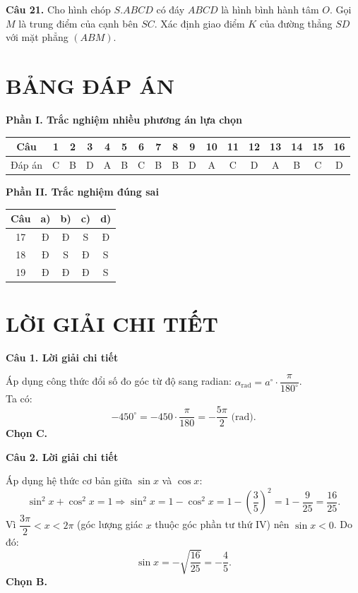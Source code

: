 \documentclass[12pt, a4paper]{article}
\newcommand{\cau}[1]{\vspace{0.12cm}\noindent\textbf{Câu #1. }}
\newcommand{\filllines}[1]{}
\begin{document}
\cau{21} Cho hình chóp $S.ABCD$ có đáy $ABCD$ là hình bình hành tâm $O$. Gọi $M$ là trung điểm của cạnh bên $SC$. Xác định giao điểm $K$ của đường thẳng $SD$ với mặt phẳng $(ABM)$.
\filllines{6}

\clearpage
\section*{BẢNG ĐÁP ÁN}
\noindent\textbf{Phần I. Trắc nghiệm nhiều phương án lựa chọn}
\begin{center}
\small
\renewcommand{\arraystretch}{1.2}
\begin{tabular}{c|*{16}{c|}}
Câu & 1 & 2 & 3 & 4 & 5 & 6 & 7 & 8 & 9 & 10 & 11 & 12 & 13 & 14 & 15 & 16 \\\hline
Đáp án & C & B & D & A & B & C & B & B & D & A & C & D & A & B & C & D \\
\end{tabular}
\end{center}
\noindent\textbf{Phần II. Trắc nghiệm đúng sai}
\begin{center}
\small
\renewcommand{\arraystretch}{1.2}
\begin{tabular}{c|c|c|c|c}
Câu & a) & b) & c) & d) \\\hline
17 & Đ & Đ & S & Đ \\
18 & Đ & S & Đ & S \\
19 & Đ & Đ & Đ & S \\
\end{tabular}
\end{center}

\section*{LỜI GIẢI CHI TIẾT}

\noindent\textbf{Câu 1. Lời giải chi tiết}\par
\begin{tcolorbox}[enhanced,breakable,colback=solutionbg,colframe=secondary!50!black,frame hidden,borderline west={3pt}{0pt}{secondary!50!black}]
Áp dụng công thức đổi số đo góc từ độ sang radian: $\alpha_{\text{rad}} = a^\circ \cdot \dfrac{\pi}{180^\circ}$.\\
Ta có:
$$-450^\circ = -450 \cdot \dfrac{\pi}{180} = -\dfrac{5\pi}{2}\text{ (rad)}.$$
\textbf{Chọn C.}
\end{tcolorbox}

\noindent\textbf{Câu 2. Lời giải chi tiết}\par
\begin{tcolorbox}[enhanced,breakable,colback=solutionbg,colframe=secondary!50!black,frame hidden,borderline west={3pt}{0pt}{secondary!50!black}]
Áp dụng hệ thức cơ bản giữa $\sin x$ và $\cos x$:
$$\sin^2 x + \cos^2 x = 1 \Rightarrow \sin^2 x = 1 - \cos^2 x = 1 - \left(\dfrac{3}{5}\right)^2 = 1 - \dfrac{9}{25} = \dfrac{16}{25}.$$
Vì $\dfrac{3\pi}{2} < x < 2\pi$ (góc lượng giác $x$ thuộc góc phần tư thứ IV) nên $\sin x < 0$. Do đó:
$$\sin x = -\sqrt{\dfrac{16}{25}} = -\dfrac{4}{5}.$$
\textbf{Chọn B.}
\end{tcolorbox}
\end{document}
